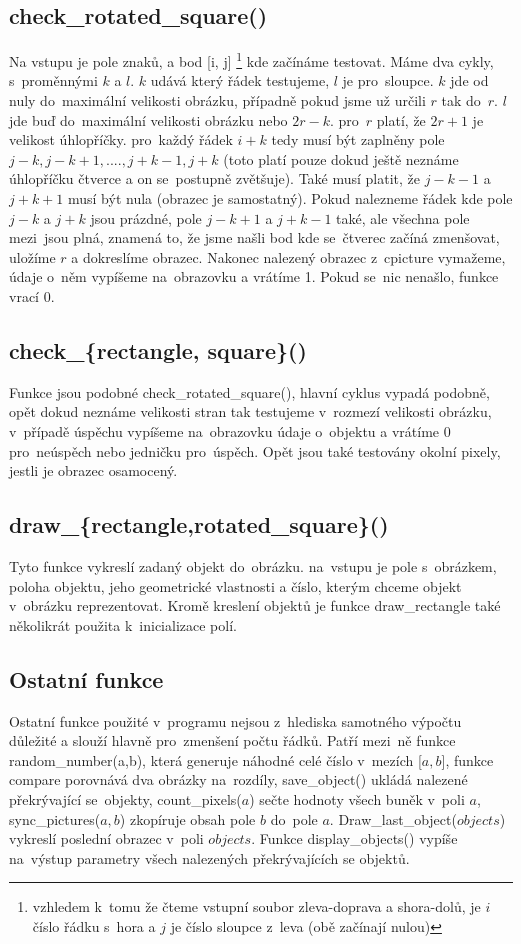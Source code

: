 \documentclass[12pt]{article}
\begin{document}
\subsection{check\_rotated\_square()}
Na vstupu je pole znaků, a bod [i, j] \footnote{vzhledem k~tomu že čteme vstupní soubor zleva-doprava a shora-dolů, je $i$ číslo řádku s~hora a $j$ je číslo sloupce z~leva (obě začínají nulou)} kde začínáme testovat. Máme dva cykly, s~proměnnými $k$ a $l$. $k$ udává který řádek testujeme, $l$ je pro~sloupce. $k$ jde od nuly do~maximální velikosti obrázku, případně pokud jsme už určili $r$ tak do~$r$. $l$ jde buď do~maximální velikosti obrázku nebo $2r - k$. pro~$r$ platí, že $2r + 1$ je velikost úhlopříčky. pro~každý řádek $i+k$ tedy musí být zaplněny pole $j-k, j-k+1, ...., j+k-1, j+k$ (toto platí pouze dokud ještě neznáme úhlopříčku čtverce a on se~postupně zvětšuje). Také musí platit, že $j-k-1$ a $j+k+1$ musí být nula (obrazec je samostatný). Pokud nalezneme řádek kde pole $j-k$ a $j+k$ jsou prázdné, pole $j-k+1$ a $j+k-1$ také, ale všechna pole mezi~jsou plná, znamená to, že jsme našli bod kde se~čtverec začíná zmenšovat, uložíme $r$ a dokreslíme obrazec. Nakonec nalezený obrazec z~cpicture vymažeme, údaje o~něm vypíšeme na~obrazovku a vrátíme 1. Pokud se~nic nenašlo, funkce vrací 0.

\subsection{check\_\{rectangle, square\}() }
Funkce jsou podobné check\_rotated\_square(), hlavní cyklus vypadá podobně, opět dokud neznáme velikosti stran tak testujeme v~rozmezí velikosti obrázku, v~případě úspěchu vypíšeme na~obrazovku údaje o~objektu a vrátíme 0 pro~neúspěch nebo jedničku pro~úspěch. Opět jsou také testovány okolní pixely, jestli je obrazec osamocený.

\subsection{draw\_\{rectangle,rotated\_square\}()}
Tyto funkce vykreslí zadaný objekt do~obrázku. na~vstupu je pole s~obrázkem, poloha objektu, jeho geometrické vlastnosti a číslo, kterým chceme objekt v~obrázku reprezentovat. Kromě kreslení objektů je funkce draw\_rectangle také několikrát použita k~inicializace polí. 

\subsection{Ostatní funkce}
Ostatní funkce použité v~programu nejsou z~hlediska samotného výpočtu důležité a slouží hlavně pro~zmenšení počtu řádků. Patří mezi~ně funkce random\_number(a,b), která generuje náhodné celé číslo v~mezích [$a,b$], funkce compare porovnává dva obrázky na~rozdíly, save\_object() ukládá nalezené překrývající se~objekty, count\_pixels($a$) sečte hodnoty všech buněk v~poli $a$, sync\_pictures($a,b$) zkopíruje obsah pole $b$ do~pole $a$. Draw\_last\_object($objects$) vykreslí poslední obrazec v~poli $objects$. Funkce display\_objects() vypíše na~výstup parametry všech nalezených překrývajících se objektů.
\end{document}

